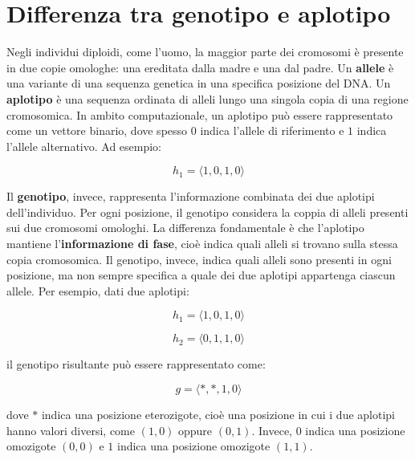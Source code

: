 \chapter{Differenza tra genotipo e aplotipo}
Negli individui diploidi, come l'uomo, la maggior parte dei cromosomi è presente in due copie omologhe: una ereditata dalla madre e una dal padre.
Un \textbf{allele} è una variante di una sequenza genetica in una specifica posizione del DNA.
Un \textbf{aplotipo} è una sequenza ordinata di alleli lungo una singola copia di una regione cromosomica. In ambito computazionale, un aplotipo può essere rappresentato come un vettore binario, dove spesso $0$ indica l'allele di riferimento e $1$ indica l'allele alternativo. Ad esempio:

\[
h_1 = \langle 1, 0, 1, 0 \rangle
\]

Il \textbf{genotipo}, invece, rappresenta l'informazione combinata dei due aplotipi dell'individuo. Per ogni posizione, il genotipo considera la coppia di alleli presenti sui due cromosomi omologhi.
La differenza fondamentale è che l'aplotipo mantiene l'\textbf{informazione di fase}, cioè indica quali alleli si trovano sulla stessa copia cromosomica. Il genotipo, invece, indica quali alleli sono presenti in ogni posizione, ma non sempre specifica a quale dei due aplotipi appartenga ciascun allele.
Per esempio, dati due aplotipi:

\[
h_1 = \langle 1, 0, 1, 0 \rangle
\]

\[
h_2 = \langle 0, 1, 1, 0 \rangle
\]

il genotipo risultante può essere rappresentato come:

\[
g = \langle *, *, 1, 0 \rangle
\]

dove $*$ indica una posizione eterozigote, cioè una posizione in cui i due aplotipi hanno valori diversi, come $(1,0)$ oppure $(0,1)$. Invece, $0$ indica una posizione omozigote $(0,0)$ e $1$ indica una posizione omozigote $(1,1)$.


